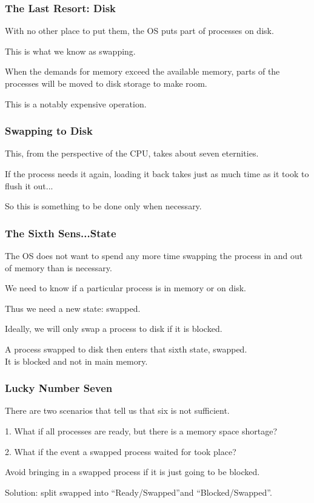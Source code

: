 \begin{frame}
	\frametitle{The Last Resort: Disk}

	With no other place to put them, the OS puts part of processes on disk.

	This is what we know as \alert{swapping}.

	When the demands for memory exceed the available memory, parts of the processes will be moved to disk storage to make room.

	This is a notably expensive operation.
\end{frame}

\begin{frame}
	\frametitle{Swapping to Disk}

	This, from the perspective of the CPU, takes about seven eternities.

	If the process needs it again, loading it back takes just as much time as it took to flush it out...

	So this is something to be done only when necessary.

\end{frame}

\begin{frame}
	\frametitle{The Sixth Sens...State}

	The OS does not want to spend any more time swapping the process in and out of memory than is necessary.

	We need to know if a particular process is in memory or on disk.

	Thus we need a new state: swapped.

	Ideally, we will only swap a process to disk if it is blocked.

	A process swapped to disk then enters that sixth state, swapped.\\
	\quad It is blocked and not in main memory.

\end{frame}

\begin{frame}
	\frametitle{Lucky Number Seven}

	There are two scenarios that tell us that six is not sufficient.

	1. What if all processes are ready, but there is a memory space shortage?

	2. What if the event a swapped process waited for took place?

	Avoid bringing in a swapped process if it is just going to be blocked.

	Solution: split swapped into ``Ready/Swapped''and ``Blocked/Swapped''.

\end{frame}

